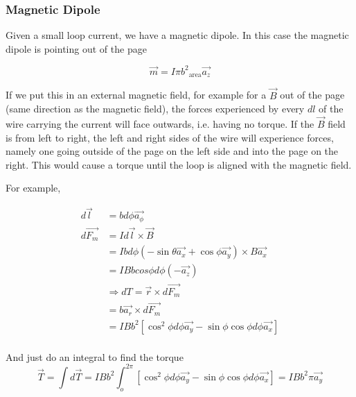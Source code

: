 \documentclass[10pt]{article}
\begin{document}
\subsubsection{Magnetic Dipole}

\begin{figure}[H]
	
\end{figure}

Given a small loop current, we have a magnetic dipole. 
In this case the magnetic dipole is pointing out of the page

\begin{equation}
\vec{m} = {I\pi b^2}_{\text{area}} \vec{a_z}
\end{equation}


If we put this in an external magnetic field, for example for a $\vec{B} $ out of the page (same direction as the magnetic field), the forces experienced by every $ dl $ of the wire carrying the current will face outwards, i.e. having no torque.
If the $\vec{B} $ field is from left to right, the left and right sides of the wire will experience forces, namely one going outside of the page on the left side and into the page on the right.
This would cause a torque until the loop is aligned with the magnetic field.

For example,

\begin{equation}
	\begin{split}
	d\vec{l} &= b d\phi \vec{a_\phi} \\
		 d \vec{F_m} &= I d \vec{l} \times \vec{B} \\
		 &= Ib d\phi (-\sin\theta \vec{a_x} + \cos \phi \vec{a_y} ) \times  B \vec{a_x} \\
		 &= IBbcos\phi d\phi (-\vec{a_z}) \\
		 &\Rightarrow dT = \vec{r} \times  d \vec{F_m} \\
		 &= b \vec{a_r} \times  d \vec{F_m} \\
		 &=  I Bb^2 [\cos^2 \phi d \phi \vec{a_y} - \sin \phi \cos \phi d\phi \vec{a_x}] \\
	 \end{split}
\end{equation}

And just do an integral to find the torque
\begin{equation}
	\vec{T} = \int d\vec{T} = IBb^2 \int_o^{2\pi}  [\cos^2 \phi d \phi \vec{a_y} - \sin \phi \cos \phi d\phi \vec{a_x}] = IBb^2 \pi \vec{a_y}
\end{equation}
\end{document}
